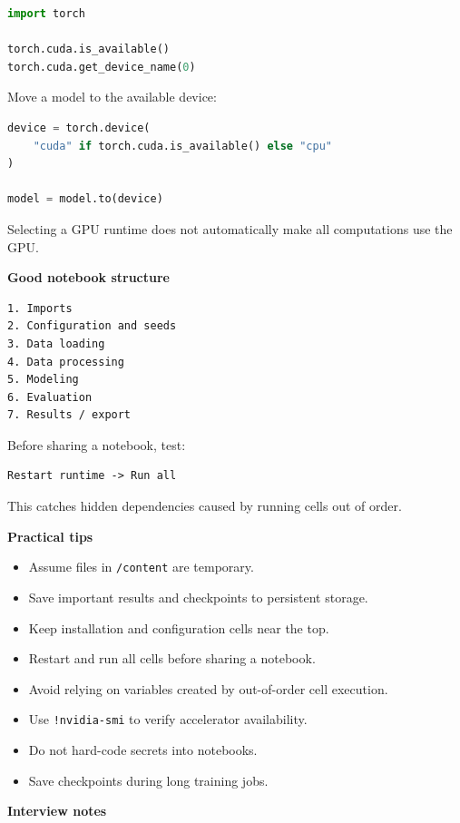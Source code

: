\documentclass[11pt,letterpaper]{article}
\begin{document}
\begin{lstlisting}[language=Python]
import torch

torch.cuda.is_available()
torch.cuda.get_device_name(0)
\end{lstlisting}

Move a model to the available device:

\begin{lstlisting}[language=Python]
device = torch.device(
    "cuda" if torch.cuda.is_available() else "cpu"
)

model = model.to(device)
\end{lstlisting}

Selecting a GPU runtime does not automatically make all computations use the
GPU.

\textbf{Good notebook structure}

\begin{lstlisting}
1. Imports
2. Configuration and seeds
3. Data loading
4. Data processing
5. Modeling
6. Evaluation
7. Results / export
\end{lstlisting}

Before sharing a notebook, test:

\begin{lstlisting}
Restart runtime -> Run all
\end{lstlisting}

This catches hidden dependencies caused by running cells out of order.

\textbf{Practical tips}

\begin{itemize}[leftmargin=*]
    \item Assume files in \texttt{/content} are temporary.
    \item Save important results and checkpoints to persistent storage.
    \item Keep installation and configuration cells near the top.
    \item Restart and run all cells before sharing a notebook.
    \item Avoid relying on variables created by out-of-order cell execution.
    \item Use \texttt{!nvidia-smi} to verify accelerator availability.
    \item Do not hard-code secrets into notebooks.
    \item Save checkpoints during long training jobs.
\end{itemize}

\textbf{Interview notes}
\end{document}
